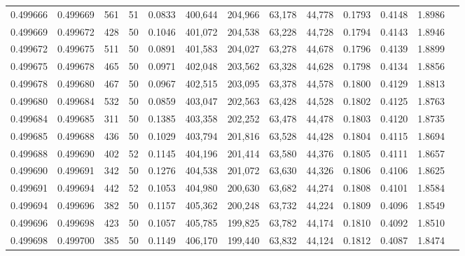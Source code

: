 \begin{tabular}{rrrrrrrrrrrrr}
0.499666 & 0.499669 & 561 &  51 &                                     0.0833 & 400,644 & 204,966 &  63,178 &  44,778 & 0.1793 & 0.4148 & 1.8986 \\
0.499669 & 0.499672 & 428 &  50 &                                     0.1046 & 401,072 & 204,538 &  63,228 &  44,728 & 0.1794 & 0.4143 & 1.8946 \\
0.499672 & 0.499675 & 511 &  50 &                                     0.0891 & 401,583 & 204,027 &  63,278 &  44,678 & 0.1796 & 0.4139 & 1.8899 \\
0.499675 & 0.499678 & 465 &  50 &                                     0.0971 & 402,048 & 203,562 &  63,328 &  44,628 & 0.1798 & 0.4134 & 1.8856 \\
0.499678 & 0.499680 & 467 &  50 &                                     0.0967 & 402,515 & 203,095 &  63,378 &  44,578 & 0.1800 & 0.4129 & 1.8813 \\
0.499680 & 0.499684 & 532 &  50 &                                     0.0859 & 403,047 & 202,563 &  63,428 &  44,528 & 0.1802 & 0.4125 & 1.8763 \\
0.499684 & 0.499685 & 311 &  50 &                                     0.1385 & 403,358 & 202,252 &  63,478 &  44,478 & 0.1803 & 0.4120 & 1.8735 \\
0.499685 & 0.499688 & 436 &  50 &                                     0.1029 & 403,794 & 201,816 &  63,528 &  44,428 & 0.1804 & 0.4115 & 1.8694 \\
0.499688 & 0.499690 & 402 &  52 &                                     0.1145 & 404,196 & 201,414 &  63,580 &  44,376 & 0.1805 & 0.4111 & 1.8657 \\
0.499690 & 0.499691 & 342 &  50 &                                     0.1276 & 404,538 & 201,072 &  63,630 &  44,326 & 0.1806 & 0.4106 & 1.8625 \\
0.499691 & 0.499694 & 442 &  52 &                                     0.1053 & 404,980 & 200,630 &  63,682 &  44,274 & 0.1808 & 0.4101 & 1.8584 \\
0.499694 & 0.499696 & 382 &  50 &                                     0.1157 & 405,362 & 200,248 &  63,732 &  44,224 & 0.1809 & 0.4096 & 1.8549 \\
0.499696 & 0.499698 & 423 &  50 &                                     0.1057 & 405,785 & 199,825 &  63,782 &  44,174 & 0.1810 & 0.4092 & 1.8510 \\
0.499698 & 0.499700 & 385 &  50 &                                     0.1149 & 406,170 & 199,440 &  63,832 &  44,124 & 0.1812 & 0.4087 & 1.8474 \\

\end{tabular}
